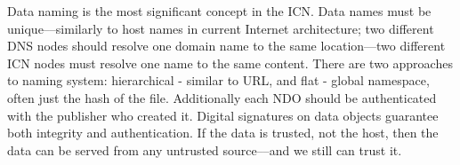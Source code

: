 \documentclass[nostrict]{szablonPG}
\begin{document}
Data naming is the most significant concept in the ICN. Data names must be unique––similarly to host names in current Internet architecture; two different DNS nodes should resolve one domain name to the same location––two different ICN nodes must resolve one name to the same content. 
There are two approaches to naming system: hierarchical - similar to URL, and flat - global namespace, often just the hash of the file.
Additionally each NDO should be authenticated with the publisher who created it. Digital signatures on data objects guarantee both integrity and authentication. If the data is trusted, not the host, then the data can be served from any untrusted source––and we still can trust it.




\end{document}

